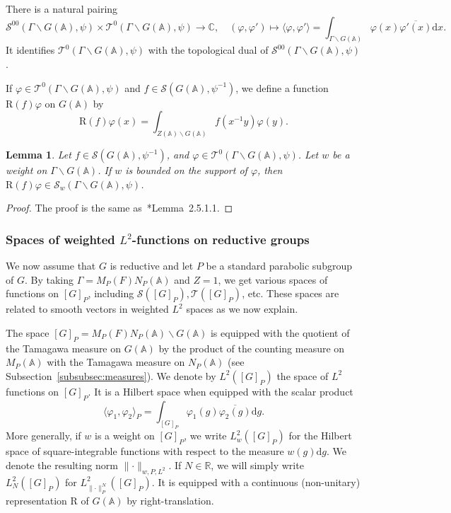 \documentclass[letterpaper,11pt]{amsart}
\newcommand{\bA}{\mathbb{A}}
\newcommand{\C}{\mathbb{C}}
\newcommand{\R}{\mathbb{R}}
\newcommand{\cS}{\mathcal{S}}
\newcommand{\cT}{\mathcal{T}}
\newcommand{\rd}{\mathrm{d}}
\newcommand{\bs}{\backslash}
\newcommand{\<}{\negthickspace}
\providecommand{\aabs}[1]{\lVert#1\rVert}
\theoremstyle{definition}
\theoremstyle{plain}
\newtheorem{lemma}[definition]{Lemma}
\theoremstyle{remark}
\numberwithin{equation}{section}
\begin{document}
There is a natural pairing
    \begin{equation}
    \label{eq:natural_pairing}
         \cS^{00}(\Gamma \backslash G(\bA),\psi)
    \times \cT^0(\Gamma \backslash G(\bA),\psi) \to \C,
    \quad (\varphi,\varphi') \mapsto
   \langle \varphi,\varphi' \rangle= \int_{\Gamma \backslash G(\bA)} \varphi(x) \overline{\varphi'(x)} \rd x.
    \end{equation}
It identifies $\cT^0(\Gamma \backslash G(\bA),\psi)$
 with the topological dual of $\cS^{00}(\Gamma \backslash G(\bA),\psi)$.



If $\varphi \in \cT^0(\Gamma \bs G(\bA), \psi)$ and $f\in \cS(G(\bA),\psi^{-1})$,
we define a function $\mathrm{R}(f)\varphi$ on $G(\bA)$ by
    \[
    \mathrm{R}(f)\varphi(x) =
    \int_{Z(\bA)\backslash G(\bA)} f(x^{-1}y) \varphi(y).
    \]

\begin{lemma}   \label{lem:translation_weighted_Schwartz}
Let $f \in \cS(G(\bA),\psi^{-1})$, and $\varphi \in
\cT^0(\Gamma \bs G(\bA), \psi)$. Let $w$ be a weight on $\Gamma \bs G(\bA)$. If $w$ is bounded on the
support of $\varphi$, then $\mathrm{R}(f) \varphi \in
\cS_w(\Gamma \bs G(\bA), \psi)$.
\end{lemma}

\begin{proof}
The proof is the same as~\cite{BPCZ}*{Lemma~2.5.1.1}.
\end{proof}


\subsubsection{Spaces of weighted $L^2$-functions on reductive groups}
\label{subsubsec:L2}
We now assume that $G$ is reductive and let $P$ be a standard parabolic subgroup of $G$. By taking $\Gamma=M_P(F)N_P(\bA)$ and $Z=1$, we get various spaces of functions on $[G]_P$, including $\cS([G]_P), \cT([G]_P)$, etc. These spaces are related to smooth vectors in weighted $L^2$ spaces as we now explain.

The space $[G]_P=M_P(F) N_P(\bA) \backslash G(\bA)$ is equipped with the quotient of the Tamagawa measure on $G(\bA)$ by the product of the counting measure on $M_P(\bA)$ with the Tamagawa measure on $N_P(\bA)$ (see Subsection~\ref{subsubsec:measures}). We denote by $L^2([G]_P)$ the space of $L^2$ functions on $[G]_P$. It is a Hilbert space when equipped with the scalar product
\begin{equation*}
    \langle \varphi_1, \varphi_2 \rangle_P = \int_{[G]_P} \varphi_1(g) \overline{\varphi_2(g)} \rd g.
\end{equation*}
More generally, if $w$ is a weight on $[G]_P$, we write $L^2_w([G]_P)$ for the Hilbert space of square-integrable functions with respect to the measure $w(g) \rd g$. We denote the resulting norm $\aabs{\cdot}_{w,P,L^2}$. If $N \in \R$, we will simply write $L^2_N([G]_P)$ for $L^2_{\aabs{\cdot}_P^N}([G]_P)$. It is equipped with a continuous (non-unitary) representation $\mathrm{R}$ of $G(\bA)$ by right-translation.
\end{document}
